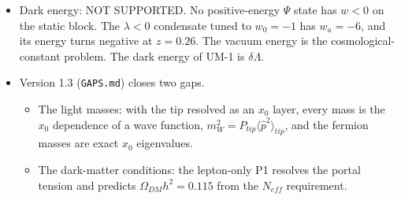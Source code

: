 \documentclass[11pt]{article}
\begin{document}
\begin{itemize}
\item Dark energy: NOT SUPPORTED. No positive-energy $\Psi$ state has $w < 0$ on the static block. The $\lambda < 0$ condensate tuned to $w_0 = -1$ has $w_a = -6$, and its energy turns negative at $z = 0.26$. The vacuum energy is the cosmological-constant problem. The dark energy of UM-1 is $\delta\Lambda$.
\item Version 1.3 (\texttt{GAPS.\allowbreak{}md}) closes two gaps.
\begin{itemize}
\item The light masses: with the tip resolved as an $x_0$ layer, every mass is the $x_0$ dependence of a wave function, $m_W^2 = P_{tip}\langle\hat p^2\rangle_{tip}$, and the fermion masses are exact $x_0$ eigenvalues.
\item The dark-matter conditions: the lepton-only P1 resolves the portal tension and predicts $\Omega_{DM}h^2 = 0.115$ from the $N_{eff}$ requirement.
\end{itemize}
\end{itemize}
\end{document}
